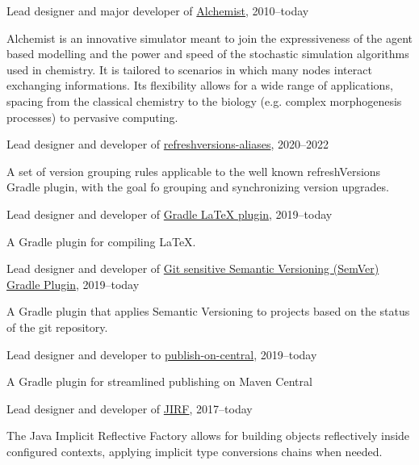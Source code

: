 \documentclass[10pt]{article}
\newenvironment{innerlist}[1][\enskip\textbullet]%
        {\begin{compactitem}[#1]}{\end{compactitem}}
\newcommand{\halfblankline}{\quad\vspace{-0.5\baselineskip}\pagebreak[3]}
\begin{document}
Lead designer and major developer of \href{http://alchemistsimulator.github.io/}{Alchemist}, 2010--today
\begin{innerlist}
    \item Alchemist is an innovative simulator meant to join the expressiveness of the agent based modelling and the power and speed of the stochastic simulation algorithms used in chemistry. It is tailored to scenarios in which many nodes interact exchanging  informations. Its flexibility allows for a wide range of applications, spacing from the classical chemistry to the biology (e.g. complex morphogenesis processes) to pervasive computing.
\end{innerlist}
\halfblankline

Lead designer and developer of \href{https://github.com/DanySK/refreshversions-aliases}{refreshversions-aliases}, 2020--2022
\begin{innerlist}
    \item A set of version grouping rules applicable to the well known refreshVersions Gradle plugin,
    with the goal fo grouping and synchronizing version upgrades.
\end{innerlist}
\halfblankline

Lead designer and developer of \href{https://github.com/DanySK/gradle-latex}{Gradle LaTeX plugin}, 2019--today
\begin{innerlist}
    \item A Gradle plugin for compiling LaTeX.
\end{innerlist}
\halfblankline

Lead designer and developer of \href{https://github.com/DanySK/git-sensitive-semantic-versioning-gradle-plugin}{Git sensitive Semantic Versioning (SemVer) Gradle Plugin}, 2019--today
\begin{innerlist}
    \item A Gradle plugin that applies Semantic Versioning to projects based on the status of the git repository.
\end{innerlist}
\halfblankline

Lead designer and developer to \href{https://github.com/DanySK/publish-on-central}{publish-on-central}, 2019--today
\begin{innerlist}
    \item A Gradle plugin for streamlined publishing on Maven Central
\end{innerlist}
\halfblankline

Lead designer and developer of \href{https://github.com/DanySK/jirf}{JIRF}, 2017--today
\begin{innerlist}
    \item The Java Implicit Reflective Factory allows for building objects reflectively inside configured contexts, applying implicit type conversions chains when needed.
\end{innerlist}
\halfblankline
\end{document}
